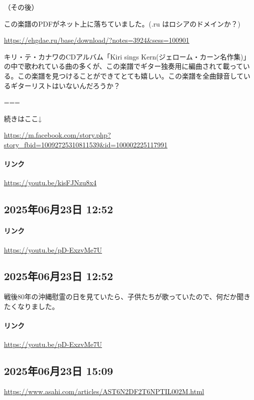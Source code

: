 （その後）

この楽譜のPDFがネット上に落ちていました。(.ru はロシアのドメインか？)

\url{https://ehgdae.ru/base/download/?notes=3924&sess=100901}

キリ・テ・カナワのCDアルバム「Kiri sings Kern(ジェローム・カーン名作集)」の中で歌われている曲の多くが、この楽譜でギター独奏用に編曲されて載っている。この楽譜を見つけることができてとても嬉しい。この楽譜を全曲録音しているギターリストはいないんだろうか？

===

続きはここ↓

\url{https://m.facebook.com/story.php?story_fbid=10092725310811539&id=100002225117991}

\paragraph{リンク}
\url{https://youtu.be/kisFJNzu8x4}

\subsection*{2025年06月23日 12:52}

\paragraph{リンク}
\url{https://youtu.be/pD-ExzvMe7U}

\subsection*{2025年06月23日 12:52}

戦後80年の沖縄慰霊の日を見ていたら、子供たちが歌っていたので、何だか聞きたくなりました。

\paragraph{リンク}
\url{https://youtu.be/pD-ExzvMe7U}

\subsection*{2025年06月23日 15:09}

\url{https://www.asahi.com/articles/AST6N2DF2T6NPTIL002M.html}

